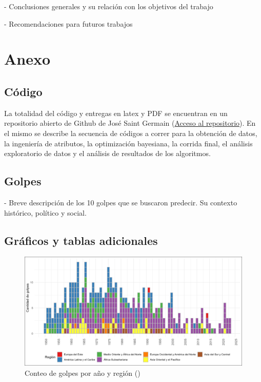 \documentclass{article}
\begin{document}
- Conclusiones generales y su relación con los objetivos del trabajo

- Recomendaciones para futuros trabajos


\section{Anexo}
\subsection{Código}
La totalidad del código y entregas en latex y PDF se encuentran en un repositorio abierto de
Github de José Saint Germain (\href{https://github.com/josesg998/esp_data_mining}{Acceso al 
repositorio}). En el mismo se describe la secuencia de códigos a correr para la obtención de 
datos, la ingeniería de atributos, la optimización bayesiana, la corrida final, el análisis 
exploratorio de datos y el análisis de resultados de los algoritmos.

\subsection{Golpes}
- Breve descripción de los 10 golpes que se buscaron predecir. Su contexto histórico, político y 
social.
\subsection{Gráficos y tablas adicionales}
\begin{figure}[H]
  \centering  
  \includegraphics[width=1\textwidth]{4_golpes_anios.png}
  \caption{Conteo de golpes por año y región (\cite{Pow11})\label{fig:golpes_anios}}
\end{figure}
\end{document}
